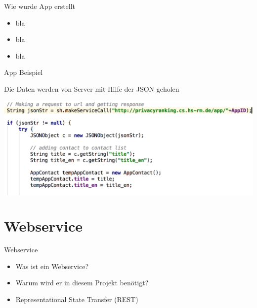\documentclass[compress,t]{beamer}
\begin{document}
\begin{frame}[fragile]{Wie wurde App erstellt}


    \begin{itemize}
        \item bla
        \item bla
        \item bla
    \end{itemize}

\end{frame}

\begin{frame}[fragile]{App Beispiel}

    Die Daten werden von Server mit Hilfe der JSON geholen

    \begin{center}
        \includegraphics[width=1.0\textwidth]{img/json_bs.png}

    \end{center}

\end{frame}



\section{Webservice}

\begin{frame}{Webservice}

    \begin{center}
        \begin{itemize}
            \item Was ist ein Webservice?
            \item Warum wird er in diesem Projekt benötigt?
            \item Representational State Transfer (REST)
        \end{itemize}
    \end{center}

\end{frame}
\end{document}
